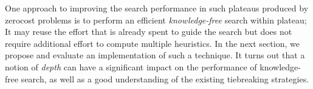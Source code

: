One approach to improving the search performance in such plateaus
produced by zerocost problems is to perform an efficient
\emph{knowledge-free} search within plateau; It may reuse the effort
that is already spent to guide the search but does not require
additional effort to compute multiple heuristics.
In the next section, we propose and evaluate an implementation of
such a technique. It turns out that a notion of \emph{depth} can have
a significant impact on the performance of knowledge-free search, as
well as a good understanding of the existing tiebreaking strategies.

